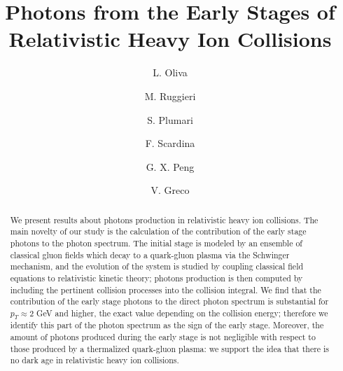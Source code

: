\documentclass[aps,prc,a4paper,nofootinbib,
preprintnumbers,superscriptaddress,twocolumn,showpacs,showkeys]{revtex4}
\begin{document}
\title{Photons from the Early Stages of Relativistic Heavy Ion Collisions}


\author{L. Oliva}


\author{M. Ruggieri}%


\author{S. Plumari}


\author{F. Scardina}


\author{G. X. Peng}


\author{V. Greco}


\begin{abstract}
We present results about photons production in relativistic heavy ion collisions. 
The main novelty of our study is the calculation of the contribution of the early stage photons
to the photon spectrum. 
The initial stage is modeled by an ensemble of classical gluon fields which decay to a quark-gluon plasma
via the Schwinger mechanism, and the evolution of the system is studied by coupling
classical field equations to relativistic kinetic theory; photons production is then computed by 
including the pertinent 
collision processes into the collision integral. We find that the contribution of the early stage photons 
to the direct photon spectrum is substantial for $p_T \approx 2$ GeV and higher,
the exact value depending on the collision energy;
therefore we identify this part of the photon spectrum as the sign of the early stage. 
Moreover, the amount of photons produced during the early stage is not negligible with respect to
those produced by a thermalized quark-gluon plasma: we support the idea that there is no dark age
in relativistic heavy ion collisions.
\end{abstract}
\end{document}
